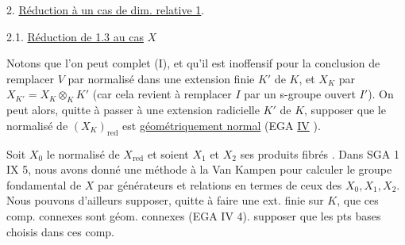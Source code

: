 2. \uline{Réduction à un cas  de dim. relative 1}.


2.1. \uline{Réduction de 1.3 au cas} $X$    


 Notons que l'on peut   complet (I\quad), et qu'il est inoffensif pour la conclusion de remplacer $V$ par  normalisé dans une extension finie $K'$ de $K$, et $X_K$ par $X_{K'}=X_K\otimes_K K'$ (car cela revient à remplacer $I$ par un s-groupe ouvert $I'$).
On peut alors, quitte à passer à une extension radicielle $K'$ de $K$, supposer que  le normalisé  de $(X_K)_{\mathrm{red}}$ est \uline{géométriquement normal} (EGA \uline{IV} ).

Soit $X_0$ le normalisé de $X_{\mathrm{red}}$ et soient $X_1$ et $X_2$ ses produits fibrés . Dans SGA 1 IX 5, nous avons donné une méthode à la Van Kampen pour calculer le groupe fondamental de $X$ par générateurs et relations en termes de ceux des  $X_0,X_1,X_2$. Nous pouvons d'ailleurs supposer, quitte à faire une ext. finie sur $K$, que ces comp. connexes sont géom. connexes (EGA IV 4).   supposer que les pts bases choisis dans ces comp. 

